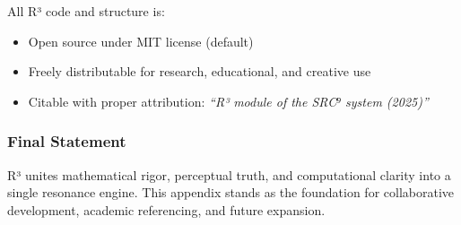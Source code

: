 \documentclass{article}
\begin{document}
All R³ code and structure is:

\begin{itemize}
    \item Open source under MIT license (default)
    \item Freely distributable for research, educational, and creative use
    \item Citable with proper attribution: \textit{“R³ module of the SRC⁹ system (2025)”}
\end{itemize}

\subsubsection*{Final Statement}

R³ unites mathematical rigor, perceptual truth, and computational clarity into a single resonance engine. This appendix stands as the foundation for collaborative development, academic referencing, and future expansion.
\end{document}
